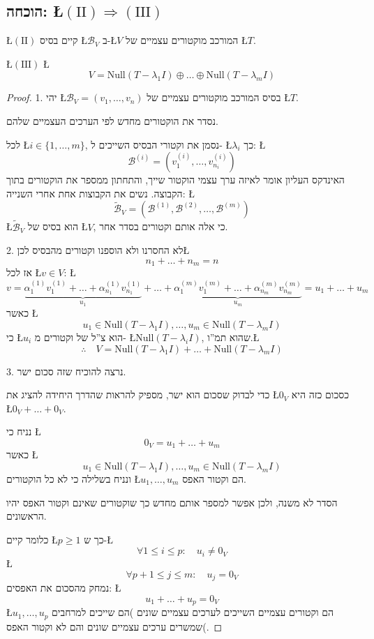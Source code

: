 \documentclass[english,hebrew]{article}
\begin{document}
\subsection{הוכחה: \L{$(\text{II})\Rightarrow(\text{III})$}}

\L{$(\text{II})$} קיים בסיס \L{$\mathcal{B}_{V}$} ב-\L{$V$} המורכב
מוקטורים עצמיים של \L{$T$}.

\L{$(\text{III})$} \L{%
\[
V=\text{Null}(T-\lambda_{1}I)\oplus\dots\oplus\text{Null}(T-\lambda_{m}I)
\]
}%

\begin{proof}
1. יהי \L{$\mathcal{B}_{V}=(v_{1},\dots,v_{n})$} בסיס המורכב מוקטורים
עצמיים של \L{$T$}.

נסדר את הוקטורים מחדש לפי הערכים העצמיים שלהם.

לכל \L{$i\in\{1,\dots,m\}$}, נסמן את וקטורי הבסיס השייכים ל- \L{$\lambda_{i}$}
כך: \L{%
\[
\mathcal{B}^{(i)}=(v_{1}^{(i)},\dots,v_{n_{i}}^{(i)})
\]
}%
האינדקס העליון אומר לאיזה ערך עצמי הוקטור שייך, והתחתון ממספר את הוקטורים
בתוך הקבוצה. נשים את הקבוצות אחת אחרי השנייה: \L{%
\[
\widetilde{\mathcal{B}}_{V}=(\mathcal{B}^{(1)},\mathcal{B}^{(2)},\dots,\mathcal{B}^{(m)})
\]
}%
\L{$\widetilde{\mathcal{B}}_{V}$} הוא בסיס של \L{$V$}, כי אלה אותם
וקטורים בסדר אחר.

2. לא החסרנו ולא הוספנו וקטורים מהבסיס לכן\L{%
\[
n_{1}+\dots+n_{m}=n
\]
}%
אז לכל \L{$v\in V$}: \L{%
\[
v=\underbrace{\alpha_{1}^{(1)}v_{1}^{(1)}+\dots+\alpha_{n_{1}}^{(1)}v_{n_{1}}^{(1)}}_{u_{1}}+\dots+\underbrace{\alpha_{1}^{(m)}v_{1}^{(m)}+\dots+\alpha_{n_{m}}^{(m)}v_{n_{m}}^{(m)}}_{u_{m}}=u_{1}+\dots+u_{m}
\]
}%
כאשר \L{%
\[
u_{1}\in\text{Null}(T-\lambda_{1}I),\dots,u_{m}\in\text{Null}(T-\lambda_{m}I)
\]
}%
כי \L{$u_{i}$} הוא צ\textquotedblright ל של וקטורים מ- \L{$\text{Null}(T-\lambda_{i}I)$},
שהוא תמ\textquotedblright ו.\L{%
\[
\therefore\quad V=\text{Null}(T-\lambda_{1}I)+\dots+\text{Null}(T-\lambda_{m}I)
\]
}%

3. נרצה להוכיח שזה סכום ישר.

כדי לבדוק שסכום הוא ישר, מספיק להראות שהדרך היחידה להציג את \L{$0_{V}$}
כסכום כזה היא \L{$0_{V}+\dots+0_{V}$}.

נניח כי \L{%
\[
0_{V}=u_{1}+\dots+u_{m}
\]
}%
כאשר \L{%
\[
u_{1}\in\text{Null}(T-\lambda_{1}I),\dots,u_{m}\in\text{Null}(T-\lambda_{m}I)
\]
}%
ונניח בשלילה כי לא כל הוקטורים \L{$u_{1},\dots,u_{m}$} הם וקטור האפס.

הסדר לא משנה, ולכן אפשר למספר אותם מחדש כך שוקטורים שאינם וקטור האפס
יהיו הראשונים.

כלומר קיים \L{$p\geq1$} כך ש-\L{%
\[
\forall1\le i\le p:\quad u_{i}\ne0_{V}
\]
}%
\L{%
\[
\forall p+1\le j\le m:\quad u_{j}=0_{V}
\]
}%
נמחק מהסכום את האפסים: \L{%
\[
u_{1}+\dots+u_{p}=0_{V}
\]
}%
\L{$u_{1},\dots,u_{p}$} הם וקטורים עצמיים השייכים לערכים עצמיים שונים
)הם שייכים למרחבים שמשרים ערכים עצמיים שונים והם לא וקטור האפס(.


\end{proof}
\end{document}
